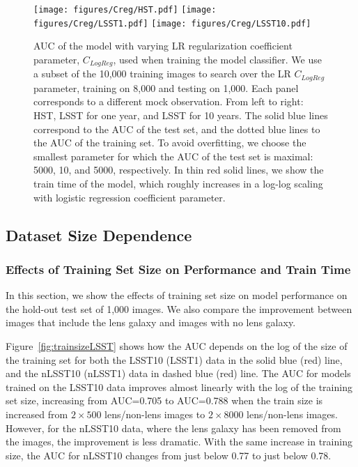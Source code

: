 \documentclass{emulateapj}
\begin{document}
\begin{figure*}[t]
\begin{center}
\texttt{[image: figures/Creg/HST.pdf]}
\texttt{[image: figures/Creg/LSST1.pdf]}
\texttt{[image: figures/Creg/LSST10.pdf]}
\caption{AUC of the model with varying LR regularization coefficient
  parameter, $C_{LogReg}$, used when training the model classifier.  We
  use a subset of the 10,000 training images to search over the LR
  $C_{LogReg}$ parameter, training on 8,000 and testing on 1,000.  Each
  panel corresponds to a different mock observation.  From left to
  right: HST, LSST for one year, and LSST for 10 years.  The solid
  blue lines correspond to the AUC of the test set, and the dotted
  blue lines to the AUC of the training set.  To avoid overfitting, we
  choose the smallest parameter for which the AUC of the test set is
  maximal: 5000, 10, and 5000, respectively.  In thin red solid lines,
  we show the train time of the model, which roughly increases in a
  log-log scaling with logistic regression coefficient
  parameter.}\label{fig:regularization}
\end{center}
\end{figure*}

\subsection{Dataset Size Dependence}\label{sec:datasize}
\subsubsection{Effects of Training Set Size on Performance and Train Time}\label{sec:trainsetsize}

In this section, we show the effects of training set size on model
performance on the hold-out test set of 1,000 images.  We also compare
the improvement between images that include the lens galaxy and images
with no lens galaxy.

Figure~\ref{fig:trainsizeLSST} shows how the AUC depends on the log of
the size of the training set for both the LSST10 (LSST1) data in the
solid blue (red) line, and the nLSST10 (nLSST1) data in dashed blue
(red) line.  The AUC for models trained on the LSST10 data improves
almost linearly with the log of the training set size, increasing from
AUC=0.705 to AUC=0.788 when the train size is increased from
$2\times500$ lens/non-lens images to $2\times8000$ lens/non-lens
images.  However, for the nLSST10 data, where the lens galaxy has been
removed from the images, the improvement is less dramatic.  With the
same increase in training size, the AUC for nLSST10 changes from just
below 0.77 to just below 0.78.
\end{document}
